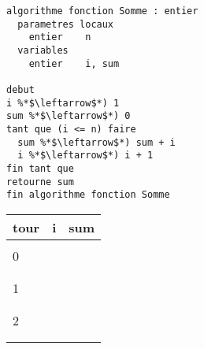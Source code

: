 \documentclass[11pt,a4paper]{article}
\begin{document}
\begin{table}[h!]
  \centering
  \begin{minipage}{0.59\textwidth}
    \centering
\begin{lstlisting}[style=algorithmique]
algorithme fonction Somme : entier
  parametres locaux
    entier    n
  variables
    entier    i, sum

debut
i %*$\leftarrow$*) 1
sum %*$\leftarrow$*) 0
tant que (i <= n) faire
  sum %*$\leftarrow$*) sum + i
  i %*$\leftarrow$*) i + 1
fin tant que
retourne sum
fin algorithme fonction Somme \end{lstlisting}
  \end{minipage}
  \hfillx
  \begin{minipage}{0.4\textwidth}
    \centering
    \begin{tabular}{|C{1cm}|C{1cm}|C{1cm}|}
        \hline
        tour &  i &  sum  \\
        \hline
             &    &       \\
        0    &    &       \\
             &    &       \\
        \hline
             &    &       \\
        1    &    &       \\
             &    &       \\
        \hline
             &    &       \\
        2    &    &       \\
             &    &       \\
        \hline
             &    &       \\

\end{tabular}
\end{minipage}
\end{table}
\end{document}
